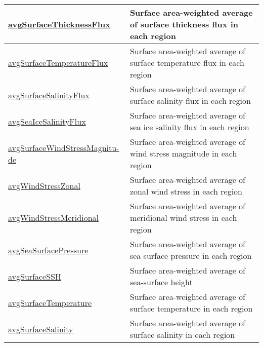 {\begin{center}
\begin{longtable}{| p{2.0in} | p{4.0in} |}
    \hline
    \hyperref[subsec:var_sec_surfaceAreaWeightedAveragesAM_avgSurfaceThicknessFlux]{avgSurfaceThicknessFlux} & Surface area-weighted average of surface thickness flux in each region \\
    \hline
    \hyperref[subsec:var_sec_surfaceAreaWeightedAveragesAM_avgSurfaceTemperatureFlux]{avgSurfaceTemperatureFlux} & Surface area-weighted average of surface temperature flux in each region \\
    \hline
    \hyperref[subsec:var_sec_surfaceAreaWeightedAveragesAM_avgSurfaceSalinityFlux]{avgSurfaceSalinityFlux} & Surface area-weighted average of surface salinity flux in each region \\
    \hline
    \hyperref[subsec:var_sec_surfaceAreaWeightedAveragesAM_avgSeaIceSalinityFlux]{avgSeaIceSalinityFlux} & Surface area-weighted average of sea ice salinity flux in each region \\
    \hline
    \hyperref[subsec:var_sec_surfaceAreaWeightedAveragesAM_avgSurfaceWindStressMagnitude]{avgSurfaceWindStressMagnitu-}\hyperref[subsec:var_sec_surfaceAreaWeightedAveragesAM_avgSurfaceWindStressMagnitude]{de}  & Surface area-weighted average of wind stress magnitude in each region \\
    \hline
    \hyperref[subsec:var_sec_surfaceAreaWeightedAveragesAM_avgWindStressZonal]{avgWindStressZonal} & Surface area-weighted average of zonal wind stress in each region \\
    \hline
    \hyperref[subsec:var_sec_surfaceAreaWeightedAveragesAM_avgWindStressMeridional]{avgWindStressMeridional} & Surface area-weighted average of meridional wind stress in each region \\
    \hline
    \hyperref[subsec:var_sec_surfaceAreaWeightedAveragesAM_avgSeaSurfacePressure]{avgSeaSurfacePressure} & Surface area-weighted average of sea surface pressure in each region \\
    \hline
    \hyperref[subsec:var_sec_surfaceAreaWeightedAveragesAM_avgSurfaceSSH]{avgSurfaceSSH} & Surface area-weighted average of sea-surface height \\
    \hline
    \hyperref[subsec:var_sec_surfaceAreaWeightedAveragesAM_avgSurfaceTemperature]{avgSurfaceTemperature} & Surface area-weighted average of surface temperature in each region \\
    \hline
    \hyperref[subsec:var_sec_surfaceAreaWeightedAveragesAM_avgSurfaceSalinity]{avgSurfaceSalinity} & Surface area-weighted average of surface salinity in each region \\

\end{longtable}
\end{center}}
